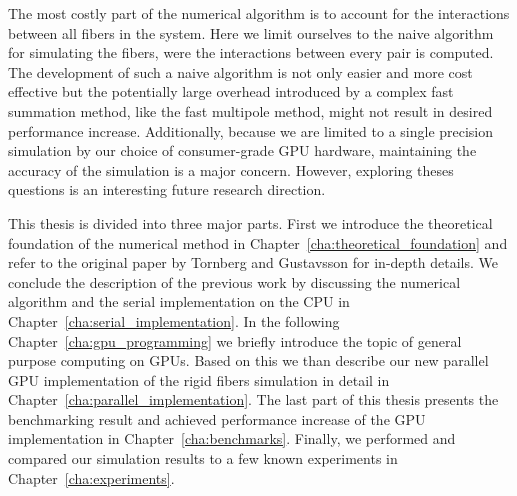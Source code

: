 The most costly part of the numerical algorithm is to account for the interactions between all fibers in the system. Here we limit ourselves to the naive algorithm for simulating the fibers, were the interactions between every pair is computed. The development of such a naive algorithm is not only easier and more cost effective but the potentially large overhead introduced by a complex fast summation method, like the fast multipole method, might not result in desired performance increase. Additionally, because we are limited to a single precision simulation by our choice of consumer-grade GPU hardware, maintaining the accuracy of the simulation is a major concern. However, exploring theses questions is an interesting future research direction.

This thesis is divided into three major parts. First we introduce the theoretical foundation of the numerical method in Chapter~\ref{cha:theoretical_foundation} and refer to the original paper by Tornberg and Gustavsson\cite{Tornberg2006} for in-depth details. We conclude the description of the previous work by discussing the numerical algorithm and the serial implementation on the CPU in Chapter~\ref{cha:serial_implementation}. In the following Chapter~\ref{cha:gpu_programming} we briefly introduce the topic of general purpose computing on GPUs. Based on this we than describe our new parallel GPU implementation of the rigid fibers simulation in detail in Chapter~\ref{cha:parallel_implementation}. The last part of this thesis presents the benchmarking result and achieved performance increase of the GPU implementation in Chapter~\ref{cha:benchmarks}. Finally, we performed and compared our simulation results to a few known experiments in Chapter~\ref{cha:experiments}.
